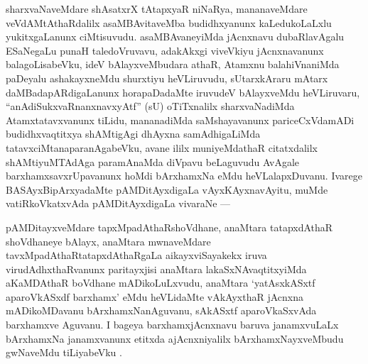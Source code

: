 \begin{artha}
sharxvaNaveMdare shAsatxrX tAtapxyaR niNaRya, mananaveMdare veVdAMtAthaRdalilx asaMBAvitaveMba budidhxyanunx kaLedukoLaLxlu yukitxgaLanunx ciMtisuvudu. asaMBAvaneyiMda jAcnxnavu dubaRlavAgalu ESaNegaLu punaH taledoVruvavu, adakAkxgi viveVkiyu jAcnxnavanunx balagoLisabeVku, ideV bAlayxveMbudara athaR, Atamxnu balahiVnaniMda paDeyalu ashakayxneMdu shurxtiyu heVLiruvudu, sUtarxkAraru mAtarx daMBadapARdigaLanunx horapaDadaMte iruvudeV bAlayxveMdu heVLiruvaru, ``anAdiSukxvaRnanxnavxyAtf'' (sU) oTiTxnalilx sharxvaNadiMda Atamxtatavxvanunx tiLidu, mananadiMda saMshayavanunx pariceCxVdamADi budidhxvaqtitxya shAMtigAgi dhAyxna samAdhigaLiMda tatavxciMtanaparanAgabeVku, avane ililx muniyeMdathaR citatxdalilx shAMtiyuMTAdAga paramAnaMda diVpavu beLaguvudu AvAgale barxhamxsavxrUpavanunx hoMdi bArxhamxNa eMdu heVLalapxDuvanu. Ivarege BASAyxBipArxyadaMte pAMDitAyxdigaLa vAyxKAyxnavAyitu, muMde vatiRkoVkatxvAda pAMDitAyxdigaLa vivaraNe --- 
\end{artha}


\begin{artha}
pAMDitayxveMdare tapxMpadAthaRshoVdhane, anaMtara tatapxdAthaR shoVdhaneye bAlayx, anaMtara mwnaveMdare tavxMpadAthaRtatapxdAthaRgaLa aikayxviSayakekx iruva virudAdhxthaRvanunx paritayxjisi anaMtara lakaSxNAvaqtitxyiMda aKaMDAthaR boVdhane mADikoLuLxvudu, anaMtara `yatAsxkASxtf aparoVkASxdf barxhamx' eMdu heVLidaMte vAkAyxthaR jAcnxna mADikoMDavanu bArxhamxNanAguvanu, sAkASxtf aparoVkaSxvAda barxhamxve Aguvanu. I bageya barxhamxjAcnxnavu baruva janamxvuLaLx bArxhamxNa janamxvanunx etitxda ajAcnxniyalilx bArxhamxNayxveMbudu gwNaveMdu tiLiyabeVku .
\end{artha}


